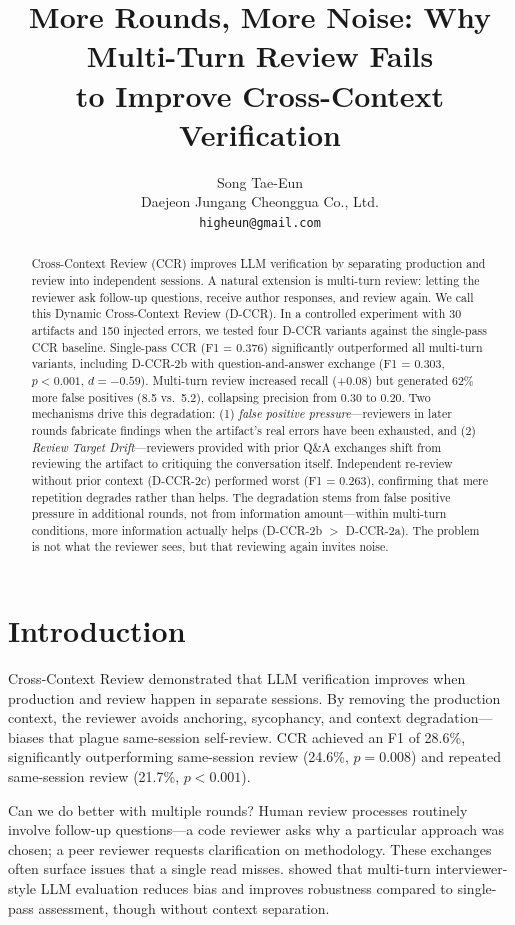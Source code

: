 \documentclass[11pt]{article}
\title{More Rounds, More Noise: Why Multi-Turn Review Fails\\to Improve Cross-Context Verification}
\author{Song Tae-Eun \\
  Daejeon Jungang Cheonggua Co., Ltd. \\
  \texttt{higheun@gmail.com}}
\begin{document}
\maketitle

\begin{abstract}
Cross-Context Review (CCR) improves LLM verification by separating production and review into independent sessions.
A natural extension is multi-turn review: letting the reviewer ask follow-up questions, receive author responses, and review again.
We call this Dynamic Cross-Context Review (D-CCR).
In a controlled experiment with 30 artifacts and 150 injected errors, we tested four D-CCR variants against the single-pass CCR baseline.
Single-pass CCR (F1 = 0.376) significantly outperformed all multi-turn variants, including D-CCR-2b with question-and-answer exchange (F1 = 0.303, $p < 0.001$, $d = -0.59$).
Multi-turn review increased recall (+0.08) but generated 62\% more false positives (8.5 vs.\ 5.2), collapsing precision from 0.30 to 0.20.
Two mechanisms drive this degradation: (1) \emph{false positive pressure}---reviewers in later rounds fabricate findings when the artifact's real errors have been exhausted, and (2) \emph{Review Target Drift}---reviewers provided with prior Q\&A exchanges shift from reviewing the artifact to critiquing the conversation itself.
Independent re-review without prior context (D-CCR-2c) performed worst (F1 = 0.263), confirming that mere repetition degrades rather than helps.
The degradation stems from false positive pressure in additional rounds, not from information amount---within multi-turn conditions, more information actually helps (D-CCR-2b $>$ D-CCR-2a).
The problem is not what the reviewer sees, but that reviewing again invites noise.
\end{abstract}

\section{Introduction}

Cross-Context Review \citep[CCR;][]{song2026ccr} demonstrated that LLM verification improves when production and review happen in separate sessions.
By removing the production context, the reviewer avoids anchoring, sycophancy, and context degradation---biases that plague same-session self-review.
CCR achieved an F1 of 28.6\%, significantly outperforming same-session review (24.6\%, $p = 0.008$) and repeated same-session review (21.7\%, $p < 0.001$).

Can we do better with multiple rounds? Human review processes routinely involve follow-up questions---a code reviewer asks why a particular approach was chosen; a peer reviewer requests clarification on methodology.
These exchanges often surface issues that a single read misses.
\citet{kim2025interviewer} showed that multi-turn interviewer-style LLM evaluation reduces bias and improves robustness compared to single-pass assessment, though without context separation.
\end{document}
